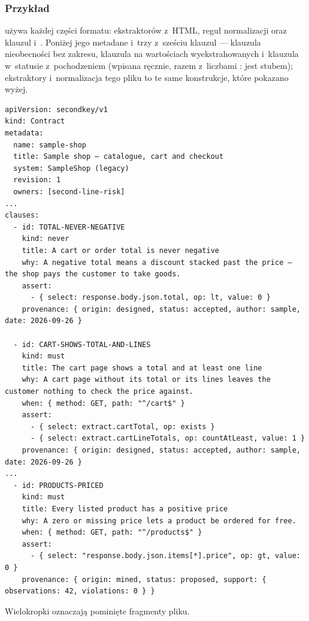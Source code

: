 \subsubsection{Przykład}

 używa każdej części formatu: ekstraktorów z~HTML, reguł
normalizacji oraz klauzul  i~. Poniżej jego metadane i~trzy z~sześciu klauzul --- klauzula nieobecności bez zakresu, klauzula na wartościach
wyekstrahowanych i~klauzula w~statusie  z~pochodzeniem  (wpisana ręcznie, razem
z~liczbami :  jest stubem);
ekstraktory i~normalizacja tego pliku to te same konstrukcje, które pokazano wyżej.

\begin{lstlisting}
apiVersion: secondkey/v1
kind: Contract
metadata:
  name: sample-shop
  title: Sample shop — catalogue, cart and checkout
  system: SampleShop (legacy)
  revision: 1
  owners: [second-line-risk]
...
clauses:
  - id: TOTAL-NEVER-NEGATIVE
    kind: never
    title: A cart or order total is never negative
    why: A negative total means a discount stacked past the price — the shop pays the customer to take goods.
    assert:
      - { select: response.body.json.total, op: lt, value: 0 }
    provenance: { origin: designed, status: accepted, author: sample, date: 2026-09-26 }

  - id: CART-SHOWS-TOTAL-AND-LINES
    kind: must
    title: The cart page shows a total and at least one line
    why: A cart page without its total or its lines leaves the customer nothing to check the price against.
    when: { method: GET, path: "^/cart$" }
    assert:
      - { select: extract.cartTotal, op: exists }
      - { select: extract.cartLineTotals, op: countAtLeast, value: 1 }
    provenance: { origin: designed, status: accepted, author: sample, date: 2026-09-26 }
...
  - id: PRODUCTS-PRICED
    kind: must
    title: Every listed product has a positive price
    why: A zero or missing price lets a product be ordered for free.
    when: { method: GET, path: "^/products$" }
    assert:
      - { select: "response.body.json.items[*].price", op: gt, value: 0 }
    provenance: { origin: mined, status: proposed, support: { observations: 42, violations: 0 } }
\end{lstlisting}

Wielokropki oznaczają pominięte fragmenty pliku.

